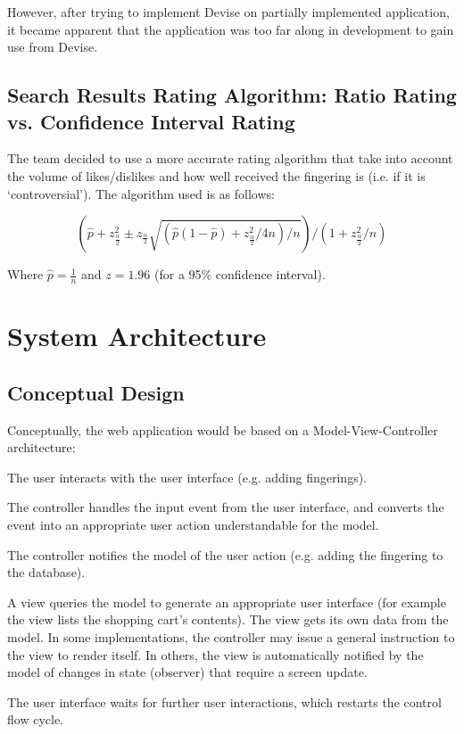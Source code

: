 \documentclass[12pt,english]{article}
\begin{document}
However, after trying to implement Devise on partially implemented
application, it became apparent that the application was too far along
in development to gain use from Devise.

\subsection{Search Results Rating Algorithm: Ratio Rating vs. Confidence Interval Rating}

The team decided to use a more accurate rating algorithm that take
into account the volume of likes/dislikes and how well received the
fingering is (i.e. if it is `controversial'). The algorithm used is
as follows:

\[
(\hat{p}+z_{\frac{\alpha}{2}}^{2}\pm z_{\frac{\alpha}{2}}\sqrt{(\hat{p}(1-\hat{p})+z_{\frac{\alpha}{2}}^{2}/4n)/n})/(1+z_{\frac{\alpha}{2}}^{2}/n)
\]


Where $\hat{p}=\frac{1}{n}$ and $z=1.96$ (for a 95\% confidence
interval).


\section{System Architecture}


\subsection{Conceptual Design}

Conceptually, the web application would be based on a Model-View-Controller
architecture: 

The user interacts with the user interface (e.g. adding fingerings). 

The controller handles the input event from the user interface, and
converts the event into an appropriate user action understandable
for the model. 

The controller notifies the model of the user action (e.g. adding
the fingering to the database).

A view queries the model to generate an appropriate user interface
(for example the view lists the shopping cart's contents). The view
gets its own data from the model. In some implementations, the controller
may issue a general instruction to the view to render itself. In others,
the view is automatically notified by the model of changes in state
(observer) that require a screen update. 

The user interface waits for further user interactions, which restarts
the control flow cycle.
\end{document}
